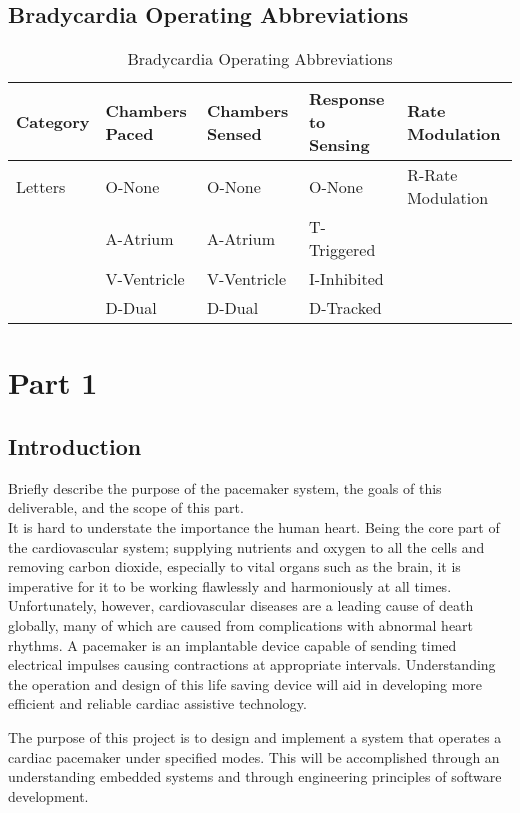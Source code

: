 \documentclass{article}
\begin{document}
\subsection{Bradycardia Operating Abbreviations}
\begin{table}[H]
    \begin{tabular}{|m{2cm}|m{2cm}|m{2cm}|m{2cm}|m{3cm}|}
        \hline
        \textbf{Category} & \textbf{Chambers Paced} & \textbf{Chambers Sensed} & \textbf{Response to Sensing} & \textbf{Rate Modulation} \\
        \hline 
        Letters     & O-None & O-None & O-None & R-Rate Modulation\\
                    & A-Atrium & A-Atrium & T-Triggered & \\
                    & V-Ventricle & V-Ventricle & I-Inhibited & \\
                    & D-Dual & D-Dual & D-Tracked & \\
        \hline
    \end{tabular}
    \caption{Bradycardia Operating Abbreviations}
\end{table}
\newpage
\section{Part 1}

\subsection{Introduction}
Briefly describe the purpose of the pacemaker system, the goals of this deliverable, and the scope of this part.
\vspace{0.5cm}\\
It is hard to understate the importance the human heart. Being the core part of the cardiovascular system; supplying nutrients and oxygen to all the cells
and removing carbon dioxide, especially to vital organs such as the brain, it is imperative for it to be working flawlessly and harmoniously at all times.
Unfortunately, however, cardiovascular diseases are a leading cause of death globally, many of which are caused from complications with 
abnormal heart rhythms. A pacemaker is an implantable device capable of sending timed electrical impulses causing contractions at 
appropriate intervals. Understanding the operation and design of this life saving device will aid in developing 
more efficient and reliable cardiac assistive technology. 

The purpose of this project is to design and implement a system that operates a cardiac pacemaker 
under specified modes. This will be accomplished through an understanding embedded systems and through engineering 
principles of software development. 
\end{document}

